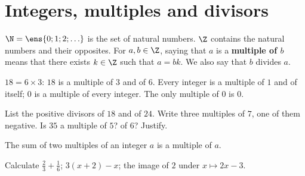 \section{Integers, multiples and divisors}
\begin{keypoint}[Definitions]
$\N=\ens{0;1;2;\ldots}$ is the set of natural numbers. $\Z$ contains the natural numbers and their opposites.
For $a,b\in\Z$, saying that $a$ is a \textbf{multiple of $b$} means that there exists $k\in\Z$ such that $a=bk$. We also say that $b$ divides $a$.
\end{keypoint}
$18=6\times3$: $18$ is a multiple of $3$ and of $6$. Every integer is a multiple of $1$ and of itself; $0$ is a multiple of every integer. The only multiple of $0$ is $0$.
\begin{example}List the positive divisors of $18$ and of $24$. Write three multiples of $7$, one of them negative. Is $35$ a multiple of $5$? of $6$? Justify.\end{example}
\begin{keypoint}
The sum of two multiples of an integer $a$ is a multiple of $a$.
\end{keypoint}
\begin{fluency}[5--10 min]Calculate $\frac23+\frac16$; $3(x+2)-x$; the image of $2$ under $x\mapsto 2x-3$.\end{fluency}

